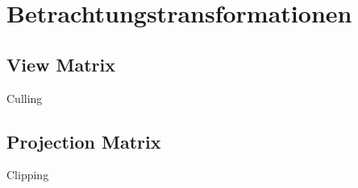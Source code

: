 \chapter{Betrachtungstransformationen}
\label{viewtransformation}

\section{View Matrix}
\label{view}
Culling

\section{Projection Matrix}
\label{projection}
Clipping